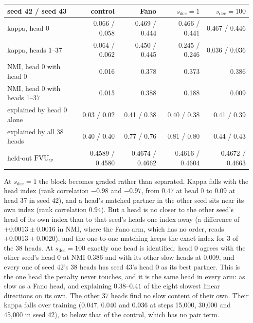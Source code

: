 \begin{center}\small\setlength{\tabcolsep}{4pt}
\begin{tabular}{@{}lrrrr@{}}
\toprule
seed 42 / seed 43 & control & Fano & $s_{\mathrm{dec}}{=}1$ & $s_{\mathrm{dec}}{=}100$ \\
\midrule
kappa, head 0 & 0.066 / 0.058 & 0.469 / 0.444 & 0.466 / 0.441 & 0.467 / 0.446 \\
kappa, heads 1--37 & 0.064 / 0.062 & 0.450 / 0.445 & 0.245 / 0.246 & 0.036 / 0.036 \\
NMI, head 0 with head 0 & 0.016 & 0.378 & 0.373 & 0.386 \\
NMI, head 0 with heads 1--37 & 0.015 & 0.388 & 0.188 & 0.009 \\
explained by head 0 alone & 0.03 / 0.02 & 0.41 / 0.38 & 0.40 / 0.38 & 0.41 / 0.39 \\
explained by all 38 heads & 0.40 / 0.40 & 0.77 / 0.76 & 0.81 / 0.80 & 0.44 / 0.43 \\
held-out $\mathrm{FVU}_w$ & 0.4589 / 0.4580 & 0.4674 / 0.4662 & 0.4616 / 0.4604 & 0.4672 / 0.4663 \\
\bottomrule
\end{tabular}
\end{center}

\noindent At $s_{\mathrm{dec}}{=}1$ the block becomes graded rather than
separated.
Kappa falls with the head index (rank correlation $-0.98$ and $-0.97$,
from $0.47$ at head 0 to $0.09$ at head 37 in seed 42), and a head's
matched partner in the other seed sits near its own index (rank
correlation $0.94$). But a head is no closer to the other seed's head of
its own index than to that seed's heads one index away (a difference of
$+0.0013 \pm 0.0016$ in NMI, where the Fano arm, which has no order,
reads $+0.0013 \pm 0.0020$), and the one-to-one matching keeps the exact
index for 3 of the 38 heads. At $s_{\mathrm{dec}}{=}100$ exactly one head
is identified:
head 0 agrees with the other seed's head 0 at NMI $0.386$ and with its
other slow heads at $0.009$, and every one of seed 42's 38 heads has seed
43's head 0 as its best partner. This is the one head the penalty never
touches, and it is the same head in every arm: as slow as a Fano head,
and explaining $0.38$--$0.41$ of the eight slowest linear directions on
its own. The other 37 heads find no slow content of their own. Their
kappa falls over training ($0.047$, $0.040$ and $0.036$ at steps
15{,}000, 30{,}000 and 45{,}000 in seed 42), to below that of the
control, which has no pair term.

